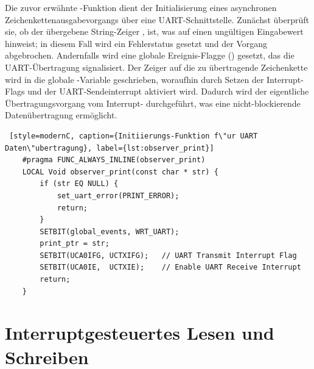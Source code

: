 \newpage
Die zuvor erw\"ahnte -Funktion dient der Initialisierung eines asynchronen Zeichenkettenausgabevorgangs \"uber eine UART-Schnittstelle. Zun\"achst \"uberpr\"uft sie, ob der \"ubergebene String-Zeiger ,  ist, was auf einen ung\"ultigen Eingabewert hinweist; in diesem Fall wird ein Fehlerstatus gesetzt und der Vorgang abgebrochen. Andernfalls wird eine globale Ereignis-Flagge () gesetzt, das die UART-\"Ubertragung signalisiert. Der Zeiger auf die zu \"ubertragende Zeichenkette wird in die globale -Variable geschrieben, woraufhin durch Setzen der Interrupt-Flags  und  der UART-Sendeinterrupt aktiviert wird. Dadurch wird der eigentliche \"Ubertragungsvorgang vom Interrupt- durchgef\"uhrt, was eine nicht-blockierende Daten\"ubertragung erm\"oglicht.

\vspace{0.5cm}
\begin{lstlisting} [style=modernC, caption={Initiierungs-Funktion f\"ur UART Daten\"ubertragung}, label={lst:observer_print}]
	#pragma FUNC_ALWAYS_INLINE(observer_print)
	LOCAL Void observer_print(const char * str) {
		if (str EQ NULL) {
			set_uart_error(PRINT_ERROR);
			return;
		}
		SETBIT(global_events, WRT_UART);
		print_ptr = str;
		SETBIT(UCA0IFG, UCTXIFG);   // UART Transmit Interrupt Flag
		SETBIT(UCA0IE,  UCTXIE);    // Enable UART Receive Interrupt
		return;
	}
\end{lstlisting}


\newpage
\section{Interruptgesteuertes Lesen und Schreiben}
\label{sec:Interruptgesteuertes_Lesen&Schreiben}

